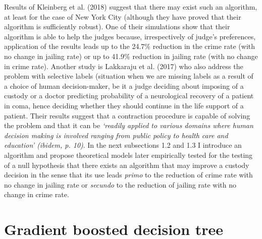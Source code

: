 \documentclass[12pt, twoside,openany]{book} %
\begin{document}
Results of Kleinberg et al. (2018) suggest that there may exist such an algorithm, at least for the case of New York City (although they have proved that their algorithm is sufficiently robust). One of their simulations show that their algorithm is able to help the judges because, irrespectively of judge's preferences, application of the results leads up to the 24.7\% reduction in the crime rate (with no change in jailing rate) or up to 41.9\% reduction in jailing rate (with no change in crime rate). Another study is Lakkaraju et al. (2017) who also address the problem with selective labels (situation when we are missing labels as a result of a choice of human decision-maker, be it a judge deciding about imposing of a custody or a doctor predicting probability of a neurological recovery of a patient in coma, hence deciding whether they should continue in the life support of a patient. Their results suggest that a contraction procedure is capable of solving the problem and that it can be \textit{‘readily applied to various domains where human decision making is involved ranging from public policy to health care and education’ (\textit{ibidem}, p. 10)}. \newline 
In the next subsections 1.2 and 1.3 I introduce an algorithm and propose theoretical models later empirically tested for the testing of a null hypothesis that there exists an algorithm that may improve a custody decision in the sense that its use leads \textit{primo} to the reduction of crime rate with no change in jailing rate or \textit{secundo} to the reduction of jailing rate with no change in crime rate. 




\section{Gradient boosted decision tree}    %
 \label{1.2}
\end{document}
